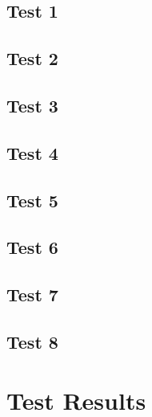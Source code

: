 \documentclass[11pt]{article}
\begin{document}
\subsection{Test 1}
\subsection{Test 2}
\subsection{Test 3}
\subsection{Test 4}
\subsection{Test 5}
\subsection{Test 6}
\subsection{Test 7}
\subsection{Test 8}

\section{Test Results}%

\end{document}
